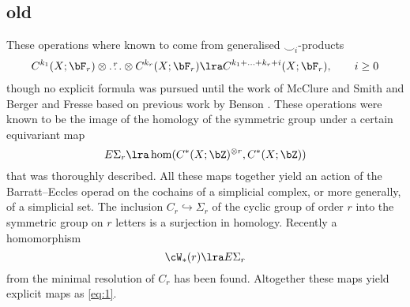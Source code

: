 \subsection{old}



These operations where known to come from generalised $\smile_i$-products
\begin{align}\label{eq:1}
C^{k_1}(X;\bF_r)\otimes\overset{r}{\ldots}\otimes C^{k_r}(X;\bF_r)\lra C^{k_1+\ldots +k_r + i}(X;\bF_r),\qquad i\geq 0
\end{align}
though no explicit formula was pursued until the work of McClure and Smith \cite{MS02} and Berger and Fresse \cite{BF03} based on previous work by Benson \cite{Benson}. These operations were known to be the image of the homology of the symmetric group under a certain equivariant map 
\[E\Sigma_r\lra \hom(C^*(X;\bZ)^{\otimes r},C^*(X;\bZ))\]
that was thoroughly described. All these maps together yield an action of the Barratt--Eccles operad on the cochains of a simplicial complex, or more generally, of a simplicial set. The inclusion $C_r\hookrightarrow \Sigma_r$ of the cyclic group of order $r$ into the symmetric group on $r$ letters is a surjection in homology. Recently \cite{Anibaletal} a homomorphism
\[\cW_*(r)\lra E\Sigma_r\]
from the minimal resolution of $C_r$ has been found. Altogether these maps yield explicit maps as \eqref{eq:1}.

